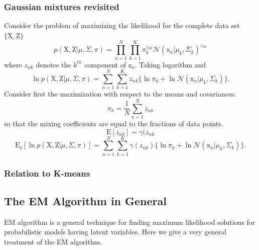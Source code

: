 \documentclass[a4paper]{book}
\newcommand{\normD}{\mathcal{N}}
\newcommand{\mrm}{\mathrm}
\begin{document}
\subsubsection*{Gaussian mixtures revisited}
Consider the problem of maximizing the likelihood for the complete data set $\{\mrm X,\mrm Z\}$
\begin{equation}\label{}
  p(\mrm{X,Z}|\mu,\Sigma,\pi) = \prod_{n=1}^{N}\prod_{k=1}^{K}\pi_k^{z_{nk}}\normD(\mrm x_n|\mu_k,\Sigma_k)^{z_{nk}}
\end{equation}
where $z_{nk}$ denotes the $k^{th}$ component of $\mrm z_n$. Taking logarithm and 
\begin{equation}\label{}
  \ln p(\mrm{X,Z}|\mu,\Sigma,\pi) = \sum_{n=1}^{N}\sum_{k=1}^{K}z_{nk}\{\ln \pi_k+\ln\normD(\mrm x_n|\mu_k,\Sigma_k)\}.
\end{equation}
Consider first the maximization with respect to the means and covariances. 
\begin{equation}\label{}
  \pi_k = \frac1N\sum_{n=1}^{N}z_{nk}
\end{equation}
so that the mixing coefficients are equal to the fractions of data points.
\begin{equation}\label{}
  \mrm E[z_{nk}] = \gamma(z_{nk}
\end{equation}
\begin{equation}\label{}
  \mrm E_{\mrm z}[\ln p(\mrm X,\mrm Z|\mu,\Sigma,\pi)] =\sum_{n=1}^{N}\sum_{k=1}^{K}\gamma(z_{nk})\{\ln \pi_k+\ln \normD(\mrm x_n|\mu_k,\Sigma_k)\}.
\end{equation}

\subsubsection*{Relation to K-means}

\subsection{The EM Algorithm in General}
EM algorithm is a general technique for finding maximum likelihood solutions for probabilistic models having latent variables. Here we give a very general treatment of the EM algorithm. 
\end{document}
